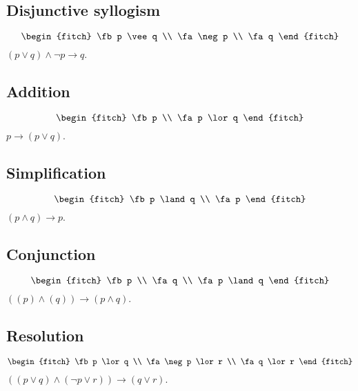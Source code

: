 \subsection{Disjunctive syllogism}
\begin{equation*}
  \begin{fitch}
    \fb p \vee q \\
    \fa \neg p \\
    \fa q
  \end{fitch}
\end{equation*}
$(p \lor q ) \land \neg p \to q$.

\subsection{Addition}
\begin{equation*}
  \begin{fitch}
    \fb p \\
    \fa p \lor q
  \end{fitch}
\end{equation*}
$ p \to (p \lor q)$.

\subsection{Simplification}
\begin{equation*}
  \begin{fitch}
    \fb p \land q \\
    \fa p
  \end{fitch}
\end{equation*}
$(p \land q) \to p$.

\subsection{Conjunction}
\begin{equation*}
  \begin{fitch}
    \fb p \\
    \fa q \\
    \fa p \land q
  \end{fitch}
\end{equation*}
$( (p) \land (q)) \to (p \land q)$.

\subsection{Resolution}
\begin{equation*}
  \begin{fitch}
    \fb p \lor q \\
    \fa \neg p \lor r \\
    \fa q \lor r
  \end{fitch}
\end{equation*}
$ ( (p \lor q) \land (\neg p \lor r ) ) \to (q \lor r)$.



